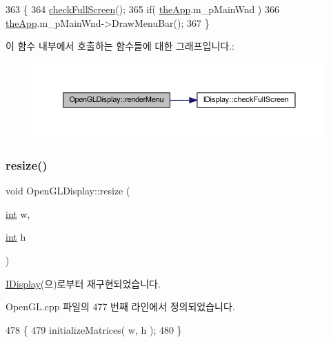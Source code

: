 \begin{DoxyCode}
363 \{
364     \mbox{\hyperlink{class_i_display_afcb9df4a4949d13491f9a07a2ce24eb0}{checkFullScreen}}();
365     \textcolor{keywordflow}{if}( \mbox{\hyperlink{_v_b_a_8cpp_a8095a9d06b37a7efe3723f3218ad8fb3}{theApp}}.m\_pMainWnd )
366         \mbox{\hyperlink{_v_b_a_8cpp_a8095a9d06b37a7efe3723f3218ad8fb3}{theApp}}.m\_pMainWnd->DrawMenuBar();
367 \}
\end{DoxyCode}
이 함수 내부에서 호출하는 함수들에 대한 그래프입니다.\+:
\nopagebreak
\begin{figure}[H]
\begin{center}
\leavevmode
\includegraphics[width=350pt]{class_open_g_l_display_a55b32d45baec33ca6f800e5d847cb8f4_cgraph}
\end{center}
\end{figure}
\mbox{\label{class_open_g_l_display_aac55119e649c9530a19b6b02fcd4910b}} 
\subsubsection{\texorpdfstring{resize()}{resize()}}
{\footnotesize\ttfamily void Open\+G\+L\+Display\+::resize (\begin{DoxyParamCaption}\item[{\mbox{\hyperlink{_util_8cpp_a0ef32aa8672df19503a49fab2d0c8071}{int}}}]{w,  }\item[{\mbox{\hyperlink{_util_8cpp_a0ef32aa8672df19503a49fab2d0c8071}{int}}}]{h }\end{DoxyParamCaption})\hspace{0.3cm}{\ttfamily [virtual]}}



\mbox{\hyperlink{class_i_display_ad0b4ba99f59edd7a6857e3b3941b3ba2}{I\+Display}}(으)로부터 재구현되었습니다.



Open\+G\+L.\+cpp 파일의 477 번째 라인에서 정의되었습니다.


\begin{DoxyCode}
478 \{
479     initializeMatrices( w, h );
480 \}
\end{DoxyCode}
\mbox{\label{class_open_g_l_display_aade9c3229c9fc024ad55b3d1419499e8}} 
